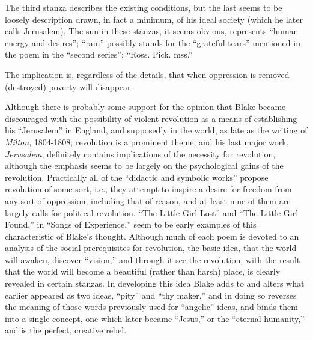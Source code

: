 
The third stanza describes the existing conditions, but the last seems to be loosely description drawn, in fact
a minimum, of his ideal society (which he later calls Jerusalem). The sun in these stanzas, it seems obvious, represents
\enquote{human energy and desires}; \enquote{rain} possibly stands for the \enquote{grateful tears} mentioned in the poem in the \enquote{second series};
\enquote{Ross. Pick. mss.}


The implication is, regardless of the details, that when oppression
is removed (destroyed) poverty will disappear.

Although there is probably some support for the opinion that Blake became discouraged with the
possibility of violent revolution as a means of establishing his \enquote{Jerusalem} in England, and supposedly
in the world, as late as the writing of \emph{Milton}, 1804-1808, revolution is a prominent theme, and his
last major work, \emph{Jerusalem}, definitely contains implications of the necessity for revolution,
although the emphasis seems to be largely on the psychological gains of the revolution. Practically all of
the \enquote{didactic and symbolic works} propose revolution of some sort, i.e., they attempt to inspire a desire
for freedom from any sort of oppression, including that of reason, and at least nine of them are largely
calls for political revolution. \enquote{The Little Girl Lost} and \enquote{The Little Girl Found,} in \enquote{Songs of Experience,} seem
to be early examples of this characteristic of Blake's thought. Although much of each poem is devoted to an analysis
of the social prerequisites for revolution, the basic idea, that the world will awaken, discover \enquote{vision,} and
through it see the revolution, with the result that the world will become a beautiful (rather than harsh) place,
is clearly revealed in certain stanzas. In developing this idea Blake adds to and alters what earlier
appeared as two ideas, \enquote{pity} and \enquote{thy maker,} and in doing so reverses the meaning of those words previously
used for \enquote{angelic} ideas, and binds them into a single concept, one which later became \enquote{Jesus,} or the
\enquote{eternal humanity,} and is the perfect, creative rebel.

